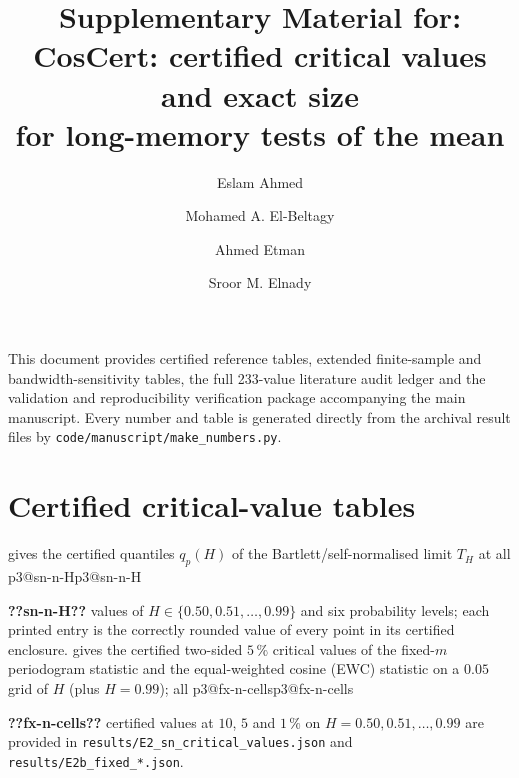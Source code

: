 \documentclass[final,3p,11pt]{elsarticle}
\makeatletter
\newcommand{\pthree}[1]{\ifcsname p3@#1\endcsname\csname p3@#1\endcsname\else
  \PackageError{p3numbers}{Undefined number key '#1'}{Run make_numbers.py}\textbf{??#1??}\fi}
\newcommand{\CosCert}{CosCert}
\makeatother
\begin{document}
\begin{frontmatter}
\title{Supplementary Material for:\\\CosCert: certified critical values and exact size\\ for long-memory tests of the mean}
\author[a]{Eslam Ahmed}
\author[a]{Mohamed A. El-Beltagy}
\author[a]{Ahmed Etman}
\author[b,c]{Sroor M. Elnady}
\end{frontmatter}

\noindent This document provides certified reference tables, extended finite-sample and bandwidth-sensitivity tables, the full 233-value literature audit ledger and the validation and reproducibility verification package accompanying the main manuscript. Every number and table is generated directly from the archival result files by \texttt{code/manuscript/make\_numbers.py}.

\section{Certified critical-value tables}\label{supp:tables}

 gives the certified quantiles $q_p(H)$ of the Bartlett/self-normalised limit $T_H$ at all \pthree{sn-n-H} values of $H\in\{0.50,0.51,\dots,0.99\}$ and six probability levels; each printed entry is the correctly rounded value of every point in its certified enclosure.  gives the certified two-sided $5\,\%$ critical values of the fixed-$m$ periodogram statistic \citep{HI17} and the equal-weighted cosine (EWC) statistic \citep{LLSW18} on a $0.05$ grid of $H$ (plus $H=0.99$); all \pthree{fx-n-cells} certified values at $10$, $5$ and $1\,\%$ on $H=0.50,0.51,\dots,0.99$ are provided in \texttt{results/E2\_sn\_critical\_values.json} and \texttt{results/E2b\_fixed\_*.json}.

{\small\setlength{\tabcolsep}{5pt}
}%
\end{document}
